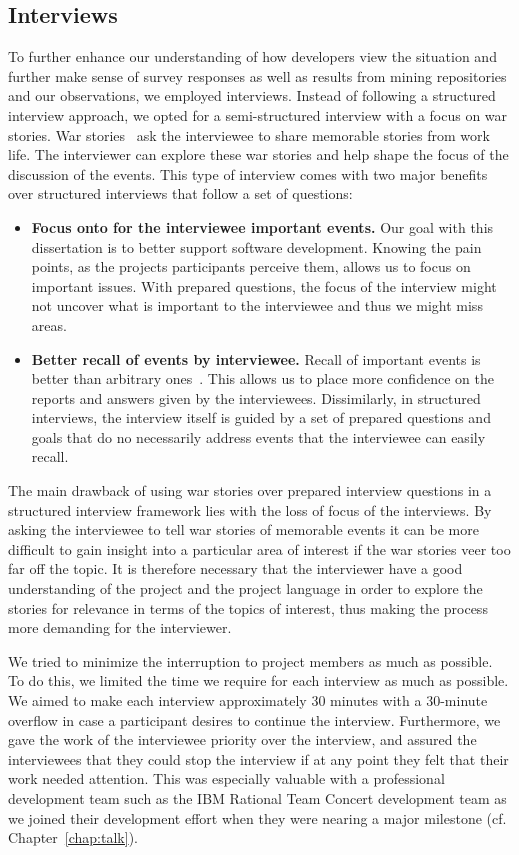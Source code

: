 \subsection{Interviews}
To further enhance our understanding of how developers view the situation and further make sense of survey responses as well as results from mining repositories and our observations, we employed interviews.
Instead of following a structured interview approach, we opted for a semi-structured interview with a focus on war stories.
War stories~\cite{lutters:ist:2007} ask the interviewee to share memorable stories from work life.
The interviewer can explore these war stories and help shape the focus of the discussion of the events.
This type of interview comes with two major benefits over structured interviews that follow a set of questions:

\begin{itemize}
\item\textbf{Focus onto for the interviewee important events.}
Our goal with this dissertation is to better support software development.
Knowing the pain points, as the projects participants perceive them, allows us to focus on important issues.
With prepared questions, the focus of the interview might not uncover what is important to the interviewee and thus we might miss areas.
\item\textbf{Better recall of events by interviewee.}
Recall of important events is better than arbitrary ones~\cite{lutters:ist:2007}.
This allows us to place more confidence on the reports and answers given by the interviewees.
Dissimilarly, in structured interviews, the interview itself is guided by a set of prepared questions and goals that do no necessarily address events that the interviewee can easily recall.
\end{itemize}

The main drawback of using war stories over prepared interview questions in a structured interview framework lies with the loss of focus of the interviews.
By asking the interviewee to tell war stories of memorable events it can be more difficult to gain insight into a particular area of interest if the war stories veer too far off the topic.
It is therefore necessary that the interviewer have a good understanding of the project and the project language in order to explore the stories for relevance in terms of the topics of interest, thus making the process more demanding for the interviewer.

We tried to minimize the interruption to project members as much as possible. 
To do this, we limited the time we require for each interview as much as possible.
We aimed to make each interview approximately 30 minutes with a 30-minute overflow in case a participant desires to continue the interview.
Furthermore, we gave the work of the interviewee priority over the interview, and assured the interviewees that they could stop the interview if at any point they felt that their work needed attention.
This was especially valuable with a professional development team such as the IBM Rational Team Concert development team as we joined their development effort when they were nearing a major milestone (cf. Chapter~\ref{chap:talk}).

